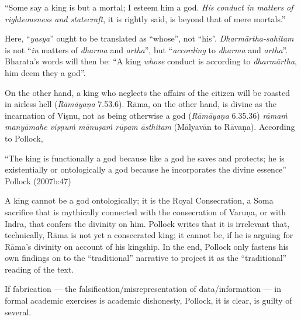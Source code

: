 \begin{myquote}
“Some say a king is but a mortal; I esteem him a god. {\sl His conduct in matters of righteousness and statecraft}, it is rightly said, is beyond that of mere mortals.” 
\end{myquote}

Here, “{\sl yasya}” ought to be translated as “whose”, not “his”. {\sl Dharmārtha-sahitam} is not “{\sl in} matters of {\sl dharma} and {\sl artha}'', but ``{\sl according} to {\sl dharma} and {\sl artha}''. Bharata’s words will then be: “A king {\sl whose} conduct is according to {\sl dharmārtha}, him deem they a god”. 

On the other hand, a king who neglects the affairs of the citizen will be roasted in airless hell ({\sl Rāmāyaṇa} 7.53.6). Rāma, on the other hand, is divine as the incarnation of Viṣnu, not as being otherwise a god ({\sl Rāmāyaṇa} 6.35.36) {\sl rāmaṁ manyāmahe viṣṇuṁ mānuṣaṁ rūpam āsthitam} (Mālyavān to Rāvaṇa). According to Pollock, 

\begin{myquote}
“The king is functionally a god because like a god he saves and protects; he is existentially or ontologically a god because he incorporates the divine essence”
\hfill Pollock (2007b:47)
\end{myquote}

A king cannot be a god ontologically; it is the Royal Consecration, a Soma sacrifice that is mythically connected with the consecration of Varuṇa, or with Indra, that confers the divinity on him. Pollock writes that it is irrelevant that, technically, Rāma is not yet a consecrated king; it cannot be, if he is arguing for Rāma’s divinity on account of his kingship. In the end, Pollock only fastens his own findings on to the “traditional” narrative to project it as the “traditional” reading of the text. 

If fabrication --- the falsification/misrepresentation of data/information ---  in formal academic exercises is academic dishonesty, Pollock, it is clear, is guilty of several.

\theendnotes
